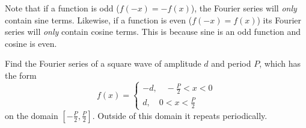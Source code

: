 \documentclass[../classical_mechanics.tex]{subfiles}
\begin{document}
            Note that if a function is odd ($f(-x)=-f(x)$), the Fourier series will \textit{only} contain sine terms.
            Likewise, if a function is even ($f(-x)=f(x)$) its Fourier series will \textit{only} contain cosine terms.
            This is because sine is an odd function and cosine is even.
            \begin{example}
                Find the Fourier series of a square wave of amplitude $d$ and period $P$, which has the form
                \begin{equation}
                    f(x)=\begin{cases}
                        -d,\quad-\frac{P}{2}<x<0\\
                        d,\quad 0<x<\frac{P}{2}
                    \end{cases}
                \end{equation}
                on the domain $\left[-\frac{P}{2},\frac{P}{2}\right]$.
                Outside of this domain it repeats periodically.


\end{example}
\end{document}
